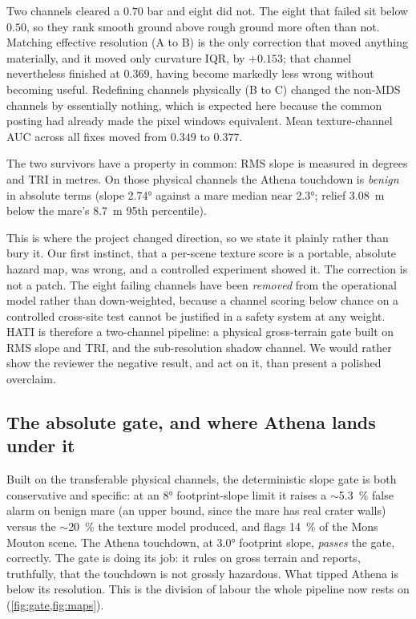 \documentclass[11pt]{article}
\begin{document}
Two channels cleared a $0.70$ bar and eight did not. The eight that failed sit below $0.50$, so
they rank smooth ground above rough ground more often than not. Matching effective resolution
(A to B) is the only correction that moved anything materially, and it moved only curvature IQR,
by $+0.153$; that channel nevertheless finished at $0.369$, having become markedly less wrong
without becoming useful. Redefining channels physically (B to C) changed the non-MDS channels by
essentially nothing, which is expected here because the common posting had already made the
pixel windows equivalent. Mean texture-channel AUC across all fixes moved from $0.349$ to
$0.377$.

The two survivors have a property in common: RMS slope is measured in degrees and TRI in metres.
On those physical channels the Athena touchdown is \emph{benign} in absolute terms (slope
\ang{2.74} against a mare median near \ang{2.3}; relief \SI{3.08}{\meter} below the mare's
\SI{8.7}{\meter} 95th percentile).

\begin{intentbox}
This is where the project changed direction, so we state it plainly rather than bury it. Our
first instinct, that a per-scene texture score is a portable, absolute hazard map, was wrong, and
a controlled experiment showed it. The correction is not a patch. The eight failing channels have
been \emph{removed} from the operational model rather than down-weighted, because a channel
scoring below chance on a controlled cross-site test cannot be justified in a safety system at
any weight. HATI is therefore a two-channel pipeline: a physical gross-terrain gate built on RMS
slope and TRI, and the sub-resolution shadow channel. We would rather show the reviewer the
negative result, and act on it, than present a polished overclaim.
\end{intentbox}

\subsection{The absolute gate, and where Athena lands under it}
Built on the transferable physical channels, the deterministic slope gate is both conservative
and specific: at an \ang{8} footprint-slope limit it raises a $\sim$\SI{5.3}{\percent} false
alarm on benign mare (an upper bound, since the mare has real crater walls) versus the
$\sim$\SI{20}{\percent} the texture model produced, and flags \SI{14}{\percent} of the Mons
Mouton scene. The Athena touchdown, at \ang{3.0} footprint slope, \emph{passes} the gate,
correctly. The gate is doing its job: it rules on gross terrain and reports, truthfully, that
the touchdown is not grossly hazardous. What tipped Athena is below its resolution. This is the
division of labour the whole pipeline now rests on (\cref{fig:gate,fig:maps}).
\end{document}
